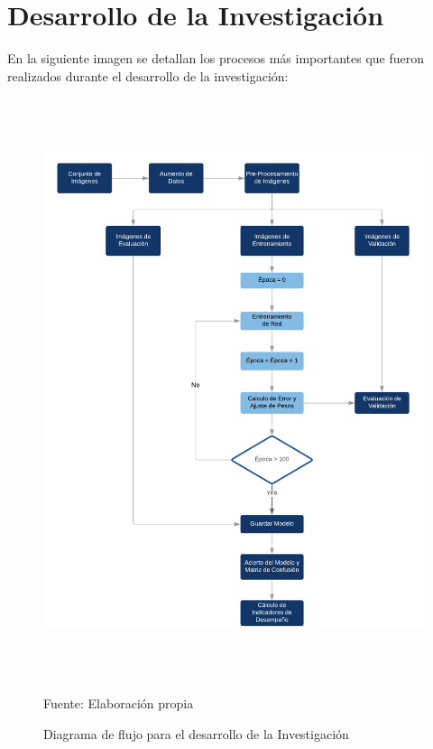 \chapter{Desarrollo de la Investigación}
\setcounter{page}{82}
\renewcommand{\baselinestretch}{1.2} %

En la siguiente imagen se detallan los procesos más importantes que fueron realizados durante el desarrollo de la investigación:

\begin{figure}[H]
	\begin{center}
	\includegraphics[width=1\textwidth,height=17cm]{images/summaryflowchart}
	\end{center}
	\vspace{1.5em}
	\begin{center}
	\caption{\small{Diagrama de flujo para el desarrollo de la Investigación}}
	\vskip -0.25cm
	{\small{Fuente: Elaboración propia}}
	\end{center}
	
\end{figure}


